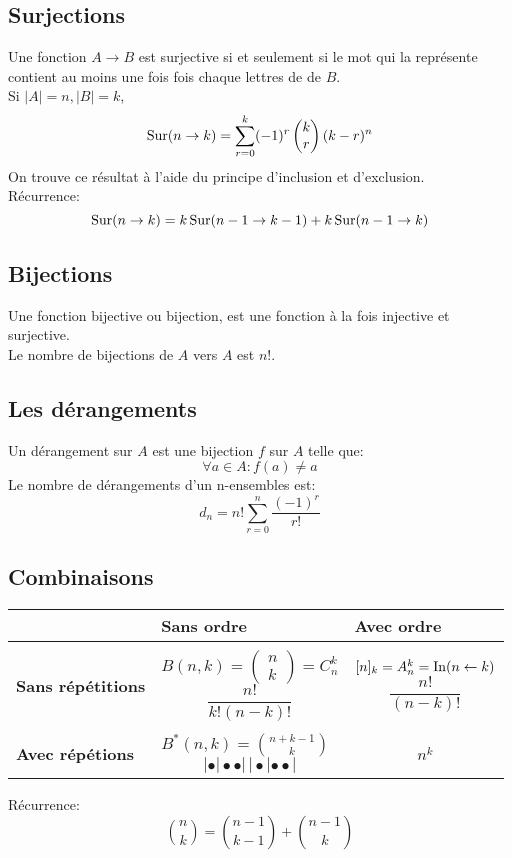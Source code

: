 \subsection{Surjections}
Une fonction $A \to B$ est surjective si et seulement si le mot qui la représente contient au moins une fois fois chaque lettres de de $B$.\\
Si $|A| = n , |B| = k$,
\[\operatorname{Sur}(n \rightarrow k) = \sum_{r = 0}^k (-1)^r\begin{pmatrix}  k  \\ r \end{pmatrix} (k - r)^n\]
On trouve ce résultat à l'aide du principe d'inclusion et d'exclusion.\\
Récurrence:
\[\operatorname{Sur}(n \to k) = k\operatorname{Sur}(n-1 \to k-1) + k\operatorname{Sur}(n-1 \to k)\]

\subsection{Bijections}
Une fonction bijective ou bijection, est une fonction à la fois injective et surjective.\\
Le nombre de bijections de $A$ vers $A$ est $n!$.

\subsection{Les dérangements}
Un dérangement sur $A$ est une bijection $f$ sur $A$ telle que:
\[\forall a \in A : f(a) \neq a\]
Le nombre de dérangements d'un n-ensembles est:
\[d_n = n! \sum_{r = 0}^{n} \frac{(-1)^r}{r!}\]

\subsection{Combinaisons}
\begin{center}
\begin{tabular}{p{4cm}|p{5cm}|p{5cm}}
	&\textbf{Sans ordre}&\textbf{Avec ordre}\\
	\hline
	&&\\
	\textbf{Sans répétitions} &
		$B(n,k) = \begin{pmatrix} n \\ k \end{pmatrix} = C^k_n$ \[\frac{n!}{k!(n - k)!}\] &
		$[n]_k = A^k_n = \operatorname{In}(n \leftarrow k)$\[\frac{n!}{(n - k)!}\]\\
	\hline
	&&\\
	\textbf{Avec répétions} &
		$B^*(n, k) = {n + k - 1 \choose k}$$$|\bullet | \bullet \bullet | \, |\bullet | \bullet \bullet |$$ &
		\[n^k\]\\
\end{tabular}
\end{center}
Récurrence:
$${n \choose k} = {n-1 \choose k-1} + {n-1 \choose k}$$


